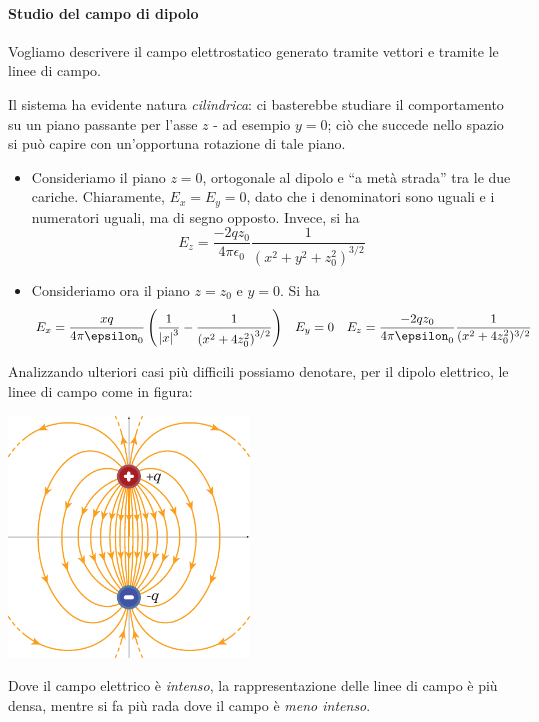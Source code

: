 \paragraph{Studio del campo di dipolo}
Vogliamo descrivere il campo elettrostatico generato tramite vettori e tramite le linee di campo.
\begin{observe}
	Il sistema ha evidente natura \textit{cilindrica}: ci basterebbe studiare il comportamento su un piano passante per l'asse $z$ - ad esempio $y=0$; ciò che succede nello spazio si può capire con un'opportuna rotazione di tale piano.
\end{observe}
\begin{itemize}
	\item Consideriamo il piano $z=0$, ortogonale al dipolo e ``a metà strada'' tra le due cariche.
	Chiaramente, $E_x=E_y=0$, dato che i denominatori sono uguali e i numeratori uguali, ma di segno opposto. Invece, si ha
	\begin{equation*}
		E_z=\frac{-2qz_0}{4\pi\epsilon_0}\frac{1}{\left(x^2+y^2+z_0^2\right)^{3/2}}
	\end{equation*}
	\item Consideriamo ora il piano $z=z_0$ e $y=0$. Si ha
	\begin{align*}
		E_x=\frac{xq}{4\pi\epsilon_0}\left(\frac{1}{\abs{x}^3}-\frac{1}{\left(x^2+4z_0^2\right)^{3/2}}\right)&&
		E_y=0&&
		E_z=\frac{-2qz_0}{4\pi\epsilon_0}\frac{1}{(x^2+4z_0^2)^{3/2}}
	\end{align*}
\end{itemize}
Analizzando ulteriori casi più difficili possiamo denotare, per il dipolo elettrico, le linee di campo come in figura:
\begin{center}
	\includegraphics[width=0.48\textwidth]{images/chp1/chp1campodipolo1.pdf}
\end{center}
\begin{observe}
	Dove il campo elettrico è \textit{intenso}, la rappresentazione delle linee di campo è più densa, mentre si fa più rada dove il campo è \textit{meno intenso}.
\end{observe}
